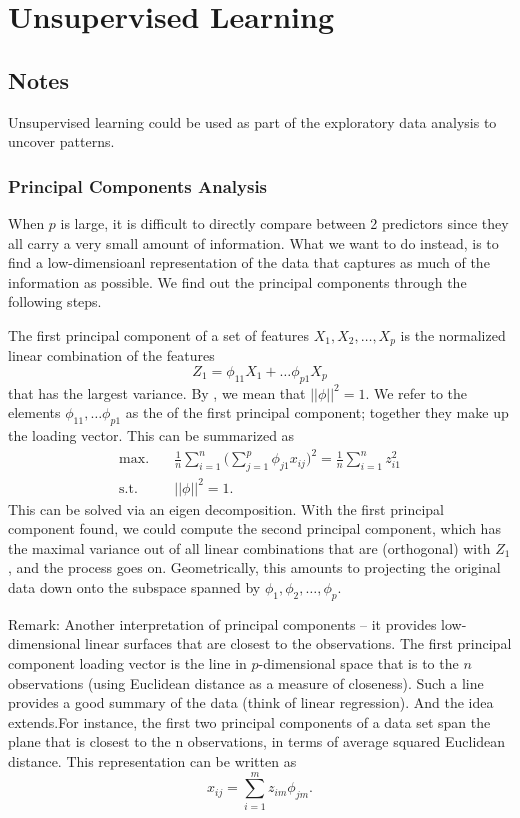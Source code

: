 \section{Unsupervised Learning}
\subsection{Notes}
Unsupervised learning could be used as part of the exploratory data analysis to uncover patterns.
\subsubsection{Principal Components Analysis}
When $p$ is large, it is difficult to directly compare between 2 predictors since they all carry a very small amount of information. What we want to do instead, is to find a low-dimensioanl representation of the data that captures as much of the information as possible. We find out the principal components through the following steps.

The first principal component of a set of features $X_1, X_2,\dots,X_p$ is the normalized linear combination of the features $$ Z_1 = \phi_{11}X_1 + \dots \phi_{p1}X_p $$ that has the largest variance. By , we mean that $||\phi||^2 =1$. We refer to the elements $\phi_{11},\dots\phi_{p1}$ as the  of the first principal component; together they make up the loading vector. This can be summarized as 
\begin{align*}
\text{max.} \quad & \frac{1}{n}\sum_{i=1}^{n}\bigg(\sum_{j=1}^{p}\phi_{j1}x_{ij}\bigg)^2 =\frac{1}{n}\sum_{i=1}^{n}z_{i1}^2\\
\text{s.t.} \quad & ||\phi||^2 =1.
\end{align*}
This can be solved via an eigen decomposition. With the first principal component found, we could compute the second principal component, which has the maximal variance out of all linear combinations that are  (orthogonal) with $Z_1$, and the process goes on. Geometrically, this amounts to projecting the original data down onto the subspace spanned by $\phi_1, \phi_2,\dots,\phi_p$.

\begin{tbox}
Remark: Another interpretation of principal components -- it provides low-dimensional linear surfaces that are closest to the observations. The first principal component loading vector is the line in $p$-dimensional space that is  to the $n$ observations (using Euclidean distance as a measure of closeness). Such a line provides a good summary of the data (think of linear regression). And the idea extends.For instance, the first two principal components of a data set span the plane that is closest to the n observations, in terms of average squared Euclidean distance. This representation can be written as $$x_{ij} = \sum_{i=1}^{m} z_{im}\phi_{jm}.$$
\end{tbox}


